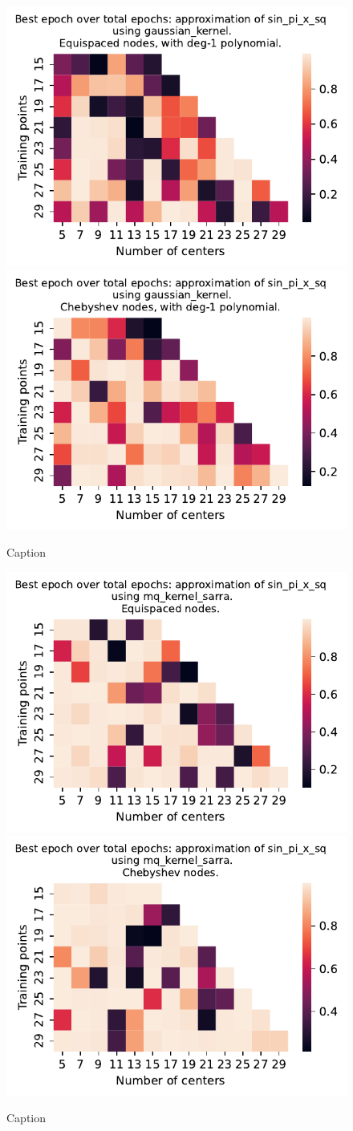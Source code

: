 \documentclass[12pt]{report} %
\begin{document}
\begin{figure}[ht]
  \centering

  \includegraphics[width=.49\textwidth]{imagenes/experiments/1d/variational_epochs/sin_pi_x_sq-Kgaussian_kernel-Poly-Equi-epochs.pdf}
  \includegraphics[width=.49\textwidth]{imagenes/experiments/1d/variational_epochs/sin_pi_x_sq-Kgaussian_kernel-Poly-Cheb-epochs.pdf}
  \caption{Caption}
  \label{fig:epochs-sin-pi-x-sq-gaussian-poly}
\end{figure}


\begin{figure}[ht]
  \centering

  \includegraphics[width=.49\textwidth]{imagenes/experiments/1d/variational_epochs/sin_pi_x_sq-Kmq_kernel_sarra-Equi-epochs.pdf}
  \includegraphics[width=.49\textwidth]{imagenes/experiments/1d/variational_epochs/sin_pi_x_sq-Kmq_kernel_sarra-Cheb-epochs.pdf}
  \caption{Caption}
  \label{fig:epochs-sin-pi-x-sq-sarra}
\end{figure}
\end{document}
